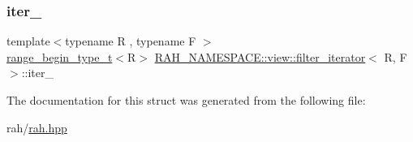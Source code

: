 \subsubsection{\texorpdfstring{iter\_}{iter\_}}
{\footnotesize\ttfamily template$<$typename R , typename F $>$ \\
\mbox{\hyperlink{namespace_r_a_h___n_a_m_e_s_p_a_c_e_a46705781d6869d5151141f871ced1e9c}{range\+\_\+begin\+\_\+type\+\_\+t}}$<$R$>$ \mbox{\hyperlink{struct_r_a_h___n_a_m_e_s_p_a_c_e_1_1view_1_1filter__iterator}{R\+A\+H\+\_\+\+N\+A\+M\+E\+S\+P\+A\+C\+E\+::view\+::filter\+\_\+iterator}}$<$ R, F $>$\+::iter\+\_\+}



The documentation for this struct was generated from the following file\+:\begin{DoxyCompactItemize}
\item 
rah/\mbox{\hyperlink{rah_8hpp}{rah.\+hpp}}\end{DoxyCompactItemize}
